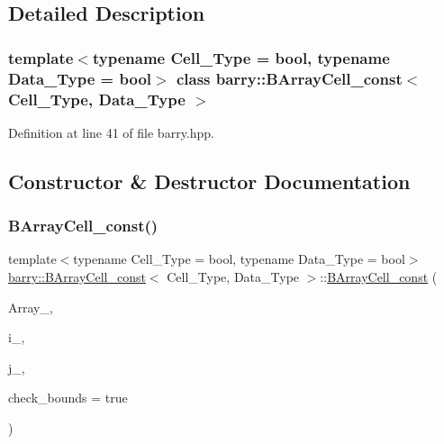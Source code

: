\subsection{Detailed Description}
\subsubsection*{template$<$typename Cell\+\_\+\+Type = bool, typename Data\+\_\+\+Type = bool$>$\newline
class barry\+::\+B\+Array\+Cell\+\_\+const$<$ Cell\+\_\+\+Type, Data\+\_\+\+Type $>$}



Definition at line 41 of file barry.\+hpp.



\subsection{Constructor \& Destructor Documentation}
\mbox{\label{classbarry_1_1_b_array_cell__const_a2a08f3d4d219450e3543786c272cb877}} 
\subsubsection{\texorpdfstring{B\+Array\+Cell\+\_\+const()}{BArrayCell\_const()}}
{\footnotesize\ttfamily template$<$typename Cell\+\_\+\+Type  = bool, typename Data\+\_\+\+Type  = bool$>$ \\
\hyperlink{classbarry_1_1_b_array_cell__const}{barry\+::\+B\+Array\+Cell\+\_\+const}$<$ Cell\+\_\+\+Type, Data\+\_\+\+Type $>$\+::\hyperlink{classbarry_1_1_b_array_cell__const}{B\+Array\+Cell\+\_\+const} (\begin{DoxyParamCaption}\item[{const \hyperlink{classbarry_1_1_b_array}{B\+Array}$<$ Cell\+\_\+\+Type, Data\+\_\+\+Type $>$ $\ast$}]{Array\+\_\+,  }\item[{\hyperlink{namespacebarry_a11dfc53ddb4672278319aa04f1e09a6c}{uint}}]{i\+\_\+,  }\item[{\hyperlink{namespacebarry_a11dfc53ddb4672278319aa04f1e09a6c}{uint}}]{j\+\_\+,  }\item[{bool}]{check\+\_\+bounds = {\ttfamily true} }\end{DoxyParamCaption})\hspace{0.3cm}{\ttfamily [inline]}}



